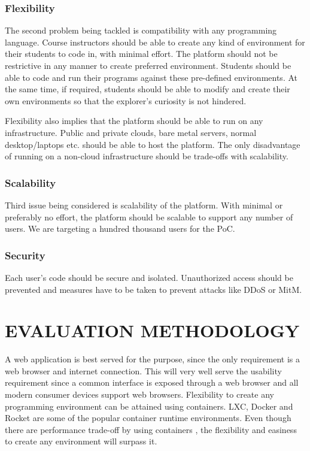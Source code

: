 \documentclass[DD]{iitmdiss}
\begin{document}
\subsection{Flexibility}
The second problem being tackled is compatibility with any programming language. Course instructors should be able to create any kind of environment for their students to code in, with minimal effort. The platform should not be restrictive in any manner to create preferred environment. Students should be able to code and run their programs against these pre-defined environments. At the same time, if required, students should be able to modify and create their own environments so that the explorer's curiosity is not hindered.

Flexibility also implies that the platform should be able to run on any infrastructure. Public and private clouds, bare metal servers, normal desktop/laptops etc. should be able to host the platform. The only disadvantage of running on a non-cloud infrastructure should be trade-offs with scalability.

\subsection{Scalability}
Third issue being considered is scalability of the platform. With minimal or preferably no effort, the platform should be scalable to support any number of users. We are targeting a hundred thousand users for the PoC. 

\subsection{Security}
Each user's code should be secure and isolated. Unauthorized access should be prevented and measures have to be taken to prevent attacks like DDoS or MitM.

\chapter{EVALUATION METHODOLOGY}

A web application is best served for the purpose, since the only requirement is a web browser and internet connection. This will very well serve the usability requirement since a common interface is exposed through a web browser and all modern consumer devices support web browsers. Flexibility to create any programming environment can be attained using containers. LXC, Docker and Rocket are some of the popular container runtime environments. Even though there are performance trade-off by using containers \citep{ruan_performance_2016}, the flexibility and easiness to create any environment will surpass it.
\end{document}

